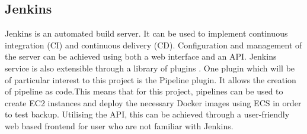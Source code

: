 \subsection{Jenkins}
Jenkins is an automated build server. It can be used to implement continuous integration (CI) and continuous delivery (CD). Configuration and management of the server can be achieved using both a web interface and an API. Jenkins service is also extensible through a library of plugins \citep{jenkins}. One plugin which will be of particular interest to this project is the Pipeline plugin. It allows the creation of pipeline as code.This means that for this project, pipelines can be used to create EC2 instances and deploy the necessary Docker images using ECS in order to test backup. Utilising the API, this can be achieved through a user-friendly web based frontend for user who are not familiar with Jenkins.





